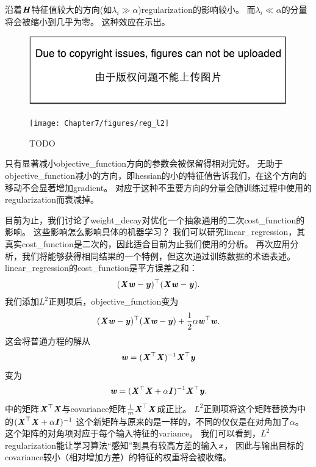沿着$\boldsymbol{\mathit{H}}$特征值较大的方向(如$\lambda_i \gg \alpha$)\gls{regularization}的影响较小。
而$\lambda_i \ll \alpha$的分量将会被缩小到几乎为零。
这种效应在示出。
\begin{figure}[!htb]
\ifOpenSource
\centerline{\includegraphics{figure.pdf}}
\else
\centerline{\texttt{[image: Chapter7/figures/reg\_l2]}}
\fi
\caption{TODO}
\label{fig:chap7_reg_l2}
\end{figure}


只有显著减小\gls{objective_function}方向的参数会被保留得相对完好。
无助于\gls{objective_function}减小的方向，即\gls{hessian}的小的特征值告诉我们，在这个方向的移动不会显著增加\gls{gradient}。
对应于这种不重要方向的分量会随训练过程中使用的\gls{regularization}而衰减掉。


目前为止，我们讨论了\gls{weight_decay}对优化一个抽象通用的二次\gls{cost_function}的影响。
这些影响怎么影响具体的机器学习？
我们可以研究\gls{linear_regression}，其真实\gls{cost_function}是二次的，因此适合目前为止我们使用的分析。
再次应用分析，我们将能够获得相同结果的一个特例，但这次通过训练数据的术语表述。
\gls{linear_regression}的\gls{cost_function}是平方误差之和：
\begin{align}
 (\boldsymbol{\mathit{X}} \boldsymbol{\mathit{w}} - \boldsymbol{\mathit{y}})^\top (\boldsymbol{\mathit{X}} \boldsymbol{\mathit{w}} - \boldsymbol{\mathit{y}}).
\end{align}
我们添加$L^2$正则项后，\gls{objective_function}变为
\begin{align}
  (\boldsymbol{\mathit{X}} \boldsymbol{\mathit{w}} - \boldsymbol{\mathit{y}})^\top (\boldsymbol{\mathit{X}} \boldsymbol{\mathit{w}} - \boldsymbol{\mathit{y}}) + \frac{1}{2}\alpha \boldsymbol{\mathit{w}}^\top \boldsymbol{\mathit{w}}.
\end{align}
这会将普通方程的解从
\begin{align}
\label{eq:716w}
  \boldsymbol{\mathit{w}} = (\boldsymbol{\mathit{X}}^\top \boldsymbol{\mathit{X}})^{-1} \boldsymbol{\mathit{X}}^\top \boldsymbol{\mathit{y}}
\end{align}
变为
\begin{align}
\label{eq:717mw}
   \boldsymbol{\mathit{w}} = (\boldsymbol{\mathit{X}}^\top \boldsymbol{\mathit{X}} + \alpha \boldsymbol{\mathit{I}})^{-1} \boldsymbol{\mathit{X}}^\top \boldsymbol{\mathit{y}} .
\end{align}
中的矩阵$\boldsymbol{\mathit{X}}^\top\boldsymbol{\mathit{X}}$与\gls{covariance}矩阵$\frac{1}{m}\boldsymbol{\mathit{X}}^\top\boldsymbol{\mathit{X}}$成正比。
$L^2$正则项将这个矩阵替换为中的$ (\boldsymbol{\mathit{X}}^\top \boldsymbol{\mathit{X}} + \alpha \boldsymbol{\mathit{I}})^{-1}$
这个新矩阵与原来的是一样的，不同的仅仅是在对角加了$\alpha$。
这个矩阵的对角项对应于每个输入特征的\gls{variance}。
我们可以看到，$L^2$\gls{regularization}能让学习算法``感知''到具有较高方差的输入$\boldsymbol{\mathit{x}}$， 因此与输出目标的\gls{covariance}较小（相对增加方差）的特征的权重将会被收缩。

